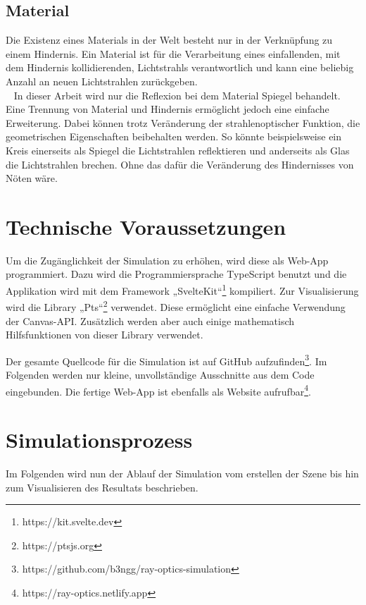 \section{Material}
\label{material}
Die Existenz eines Materials  in der Welt besteht nur in der Verknüpfung zu einem Hindernis. 
Ein Material ist für die Verarbeitung eines einfallenden, mit dem Hindernis kollidierenden, Lichtstrahls verantwortlich 
und kann eine beliebig Anzahl an neuen Lichtstrahlen zurückgeben. \\ 
In dieser Arbeit wird nur die Reflexion bei dem Material Spiegel  behandelt. 
Eine Trennung von Material und Hindernis ermöglicht jedoch eine einfache Erweiterung.
Dabei können trotz Veränderung der strahlenoptischer Funktion, die geometrischen Eigenschaften beibehalten werden.
So könnte beispielsweise ein Kreis einerseits als Spiegel die Lichtstrahlen reflektieren 
und anderseits als Glas die Lichtstrahlen brechen. Ohne das dafür die Veränderung des Hindernisses von Nöten wäre.


\chapter{Technische Voraussetzungen}
Um die Zugänglichkeit der Simulation zu erhöhen, wird diese als Web-App programmiert. 
Dazu wird die Programmiersprache TypeScript benutzt und die Applikation wird mit dem Framework „SvelteKit“\footnote{https://kit.svelte.dev} kompiliert.
Zur Visualisierung wird die Library „Pts“\footnote{https://ptsjs.org} verwendet. Diese ermöglicht eine einfache Verwendung der Canvas-API. 
Zusätzlich werden aber auch einige mathematisch Hilfsfunktionen von dieser Library verwendet.

Der gesamte Quellcode für die Simulation ist auf GitHub aufzufinden\footnote{https://github.com/b3ngg/ray-optics-simulation}. 
Im Folgenden werden nur kleine, unvollständige Ausschnitte aus dem Code eingebunden. 
Die fertige Web-App ist ebenfalls als Website aufrufbar\footnote{https://ray-optics.netlify.app}.


\chapter{Simulationsprozess}
Im Folgenden wird nun der Ablauf der Simulation vom erstellen der Szene bis hin zum Visualisieren des Resultats beschrieben.

